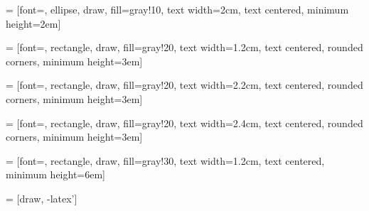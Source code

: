 %
%
%

 = [font=\small, ellipse, draw, fill=gray!10, 
    text width=2cm, text centered, minimum height=2em]

 = [font=\footnotesize, rectangle, draw, fill=gray!20, 
    text width=1.2cm, text centered, rounded corners, minimum height=3em]

 = [font=\footnotesize, rectangle, draw, fill=gray!20, 
    text width=2.2cm, text centered, rounded corners, minimum height=3em]

 = [font=\footnotesize, rectangle, draw, fill=gray!20, 
    text width=2.4cm, text centered, rounded corners, minimum height=3em]
    
 = [font=\tiny, rectangle, draw, fill=gray!30, 
    text width=1.2cm, text centered, minimum height=6em]

 = [draw, -latex']

